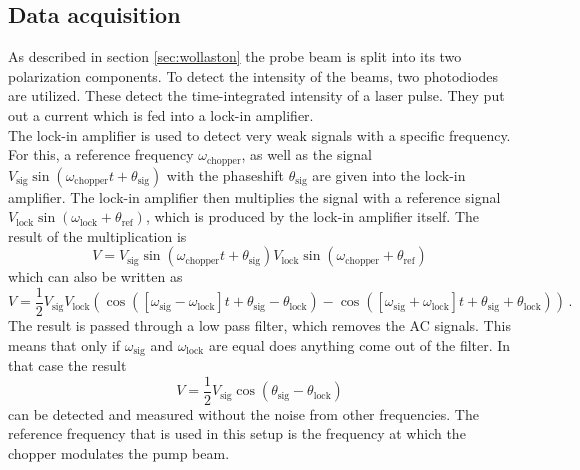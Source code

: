 \subsection{Data acquisition}
\label{sec:data_acq}
As described in section \ref{sec:wollaston} the probe beam is split into its two polarization components.
To detect the intensity of the beams, two photodiodes are utilized.
These detect the time-integrated intensity of a laser pulse.
They put out a current which is fed into a lock-in amplifier.
\\
The lock-in amplifier is used to detect very weak signals with a specific frequency.
For this, a reference frequency $\omega_\text{chopper}$, as well as the signal $V_\text{sig}\sin(\omega_\text{chopper}t + \theta_\text{sig})$ with the phaseshift $\theta_\text{sig}$ are given into the lock-in amplifier.
The lock-in amplifier then multiplies the signal with a reference signal $V_\text{lock}\sin(\omega_\text{lock} + \theta_\text{ref})$, which is produced by the lock-in amplifier itself.
The result of the multiplication is
\begin{equation}
    V = V_\text{sig}\sin(\omega_\text{chopper}t + \theta_\text{sig})V_\text{lock}\sin(\omega_\text{chopper} + \theta_\text{ref})
\end{equation}
which can also be written as 
\begin{equation}
    V = \frac{1}{2} V_\text{sig} V_\text{lock} \left ( \cos([\omega_\text{sig} - \omega_\text{lock}]t +\theta_\text{sig} - \theta_\text{lock}) - \cos([\omega_\text{sig} + \omega_\text{lock}]t +\theta_\text{sig} + \theta_\text{lock})\right ) \, .
\end{equation}
The result is passed through a low pass filter, which removes the AC signals.
This means that only if $\omega_\text{sig}$ and $\omega_\text{lock}$ are equal does anything come out of the filter.
In that case the result 
\begin{equation}
    V = \frac{1}{2}V_\text{sig}\cos(\theta_\text{sig}-\theta_\text{lock})
\end{equation} 
can be detected and measured without the noise from other frequencies.
The reference frequency that is used in this setup is the frequency at which the chopper modulates the pump beam.
